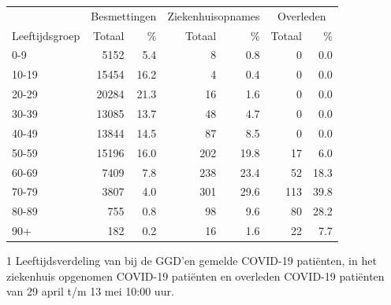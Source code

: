 \documentclass[
  english,
  man,floatsintext]{apa6}
\begin{document}
\begin{table}
\centering\begingroup\fontsize{11}{13}\selectfont

\begin{threeparttable}
\begin{tabular}{lrrrrrr}
\toprule
\multicolumn{1}{c}{ } & \multicolumn{2}{c}{Besmettingen} & \multicolumn{2}{c}{Ziekenhuisopnames} & \multicolumn{2}{c}{Overleden} \\
\cmidrule(l{3pt}r{3pt}){2-3} \cmidrule(l{3pt}r{3pt}){4-5} \cmidrule(l{3pt}r{3pt}){6-7}
Leeftijdsgroep & Totaal & \% & Totaal & \% & Totaal & \%\\
\midrule
0-9 & 5152 & 5.4 & 8 & 0.8 & 0 & 0.0\\
10-19 & 15454 & 16.2 & 4 & 0.4 & 0 & 0.0\\
20-29 & 20284 & 21.3 & 16 & 1.6 & 0 & 0.0\\
30-39 & 13085 & 13.7 & 48 & 4.7 & 0 & 0.0\\
40-49 & 13844 & 14.5 & 87 & 8.5 & 0 & 0.0\\
50-59 & 15196 & 16.0 & 202 & 19.8 & 17 & 6.0\\
60-69 & 7409 & 7.8 & 238 & 23.4 & 52 & 18.3\\
70-79 & 3807 & 4.0 & 301 & 29.6 & 113 & 39.8\\
80-89 & 755 & 0.8 & 98 & 9.6 & 80 & 28.2\\
90+ & 182 & 0.2 & 16 & 1.6 & 22 & 7.7\\
\bottomrule
\end{tabular}
\begin{tablenotes}
\item[1] Leeftijdsverdeling van bij de GGD’en gemelde COVID-19 patiënten, in het ziekenhuis opgenomen COVID-19 patiënten en overleden COVID-19 patiënten van 29 april t/m 13 mei 10:00 uur.
\end{tablenotes}
\end{threeparttable}
\endgroup{}
\end{table}

\newpage
\end{document}
